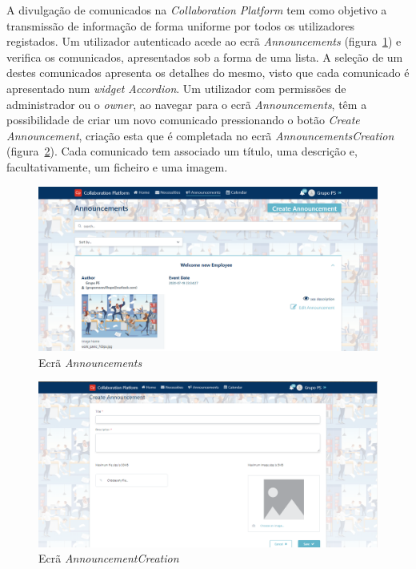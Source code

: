 A divulgação de comunicados na \textit{Collaboration Platform} tem como objetivo a transmissão de informação de forma uniforme por todos os utilizadores registados.
Um utilizador autenticado acede ao ecrã \textit{Announcements} (figura~\ref{fig:announcements}) e verifica os comunicados, apresentados sob a forma de uma lista. 
A seleção de um destes comunicados apresenta os detalhes do mesmo, visto que cada comunicado é apresentado num \textit{widget Accordion}. 
Um utilizador com permissões de administrador ou o \textit{owner}, ao navegar para o ecrã \textit{Announcements}, têm a possibilidade de criar um novo comunicado pressionando o botão \textit{Create Announcement}, criação esta que é completada no ecrã \textit{AnnouncementsCreation} (figura~\ref{fig:announcement_creation}).
Cada comunicado tem associado um título, uma descrição e, facultativamente, um ficheiro e uma imagem.

\begin{figure}[H]
  \centering 
  \includegraphics[scale=0.4]{figures/Announcements.png}
  \caption{Ecrã \textit{Announcements}}\label{fig:announcements}
\end{figure}



\begin{figure}[H]
  \centering 
  \includegraphics[scale=0.4]{figures/AnnouncementCreation.png}
  \caption{Ecrã \textit{AnnouncementCreation}}\label{fig:announcement_creation}
\end{figure}


